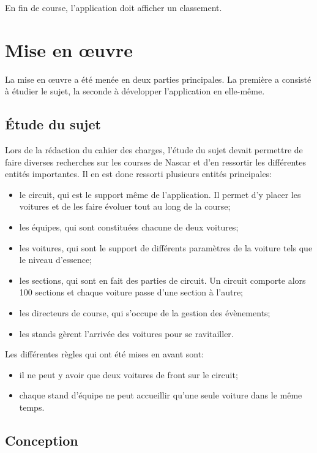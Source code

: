 \documentclass[a4paper, 11pt]{article}
\begin{document}
			En fin de course, l'application doit afficher un classement.
			
			
	\section{Mise en œuvre}
	
		La mise en œuvre a été menée en deux parties principales. La première a consisté à étudier le sujet, la seconde à développer l'application en elle-même. 
		
		\subsection{Étude du sujet}
		
		Lors de la rédaction du cahier des charges, l'étude du sujet devait permettre de faire diverses recherches sur les courses de Nascar et d'en ressortir les différentes entités importantes. Il en est donc ressorti plusieurs entités principales:
		\begin{itemize}
			\item le circuit, qui est le support même de l'application. Il permet d'y placer les voitures et de les faire évoluer tout au long de la course;
			\item les équipes, qui sont constituées chacune de deux voitures;
			\item les voitures, qui sont le support de différents paramètres de la voiture tels que le niveau d'essence;
			\item les sections, qui sont en fait des parties de circuit. Un circuit comporte alors 100 sections et chaque voiture passe d'une section à l'autre;
			\item les directeurs de course, qui s'occupe de la gestion des évènements;
			\item les stands gèrent l'arrivée des voitures pour se ravitailler.\\
		\end{itemize}
		
		Les différentes règles qui ont été mises en avant sont:
		\begin{itemize}
			\item il ne peut y avoir que deux voitures de front sur le circuit;
			\item chaque stand d'équipe ne peut accueillir qu'une seule voiture dans le même temps.
		\end{itemize}
		
		
		\subsection{Conception}
		
\end{document}
